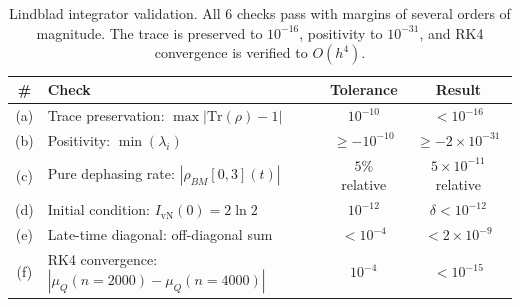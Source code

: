 \documentclass[12pt,a4paper]{article}
\newcommand{\IvN}{I_{\mathrm{vN}}}
\newcommand{\muQ}{\mu_Q}
\renewcommand{\Tr}{\mathrm{Tr}}
\begin{document}
\begin{table}[H]
\centering
\small
\begin{tabular}{clcc}
  \toprule
  \# & Check & Tolerance & Result \\
  \midrule
  (a) & Trace preservation: $\max|\Tr(\rho) - 1|$
      & $10^{-10}$ & $< 10^{-16}$ \\
  (b) & Positivity: $\min(\lambda_i)$
      & $\ge -10^{-10}$ & $\ge -2 \times 10^{-31}$ \\
  (c) & Pure dephasing rate: $|\rho_{BM}[0,3](t)|$
      & $5\%$ relative & $5 \times 10^{-11}$ relative \\
  (d) & Initial condition: $\IvN(0) = 2\ln 2$
      & $10^{-12}$ & $\delta < 10^{-12}$ \\
  (e) & Late-time diagonal: off-diagonal sum
      & $< 10^{-4}$ & $< 2 \times 10^{-9}$ \\
  (f) & RK4 convergence: $|\muQ(n{=}2000) - \muQ(n{=}4000)|$
      & $10^{-4}$ & $< 10^{-15}$ \\
  \bottomrule
\end{tabular}
\caption{Lindblad integrator validation.
All 6 checks pass with margins of several orders of magnitude.
The trace is preserved to $10^{-16}$, positivity to $10^{-31}$,
and RK4 convergence is verified to $O(h^4)$.}
\label{tab:lindblad-checks}
\end{table}

\end{document}
